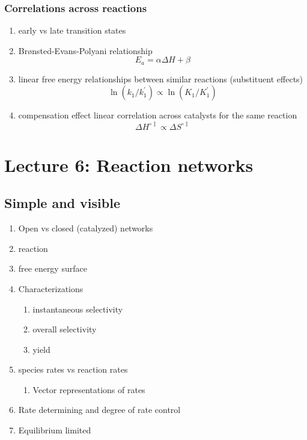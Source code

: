 \documentclass[11pt]{article}
\begin{document}
\subsubsection{Correlations across reactions}
\label{sec:org1b1affc}
\begin{enumerate}
\item early vs late transition states
\item Br\o{}nsted-Evans-Polyani relationship
\[ E_a = \alpha \Delta H + \beta \]
\item linear free energy relationships between similar reactions (substituent effects)
\[ \ln (k_1/k_1^\prime) \propto \ln (K_1/K_1^\prime) \]
\item compensation effect linear correlation across catalysts for the same reaction
\[\Delta H^{\circ\ddagger} \propto \Delta S^{\circ\ddagger}\]
\end{enumerate}
\section{Lecture 6: Reaction networks}
\label{sec:org880f7a1}

\subsection{Simple and visible}
\label{sec:org1915153}
\begin{enumerate}
\item Open vs closed (catalyzed) networks
\item {} reaction
\item free energy surface
\item Characterizations
\begin{enumerate}
\item instantaneous selectivity
\item overall selectivity
\item yield
\end{enumerate}
\item species rates vs reaction rates
\begin{enumerate}
\item Vector representations of rates
\end{enumerate}
\item Rate determining and degree of rate control
\item Equilibrium limited
\end{enumerate}
\end{document}
